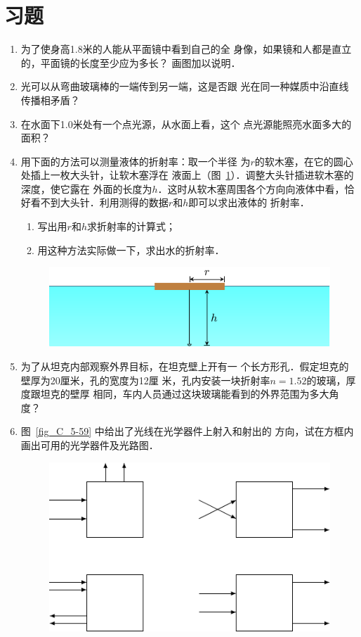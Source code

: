 \section*{习题}
\begin{enumerate}
    \item 为了使身高1.8米的人能从平面镜中看到自己的全
身像，如果镜和人都是直立的，平面镜的长度至少应为多长？
画图加以说明．
\item 光可以从弯曲玻璃棒的一端传到另一端，这是否跟
光在同一种媒质中沿直线传播相矛盾？
\item 在水面下1.0米处有一个点光源，从水面上看，这个
点光源能照亮水面多大的面积？
\item 用下面的方法可以测量液体的折射率：取一个半径
为$r$的软木塞，在它的圆心处插上一枚大头针，让软木塞浮在
液面上（图~\ref{fig_C_5-58}）．调整大头针插进软木塞的深度，使它露在
外面的长度为$h$．这时从软木塞周围各个方向向液体中看，恰
好看不到大头针．利用测得的数据$r$和$h$即可以求出液体的
折射率．
\begin{enumerate}
    \item 写出用$r$和$h$求折射率的计算式；
    \item 用这种方法实际做一下，求出水的折射率．
\end{enumerate}
\begin{figure}[htbp]
    \centering
    \includegraphics{fig/C/5-58.pdf}
    \caption{}\label{fig_C_5-58}
\end{figure}
\item 为了从坦克内部观察外界目标，在坦克壁上开有一
个长方形孔．假定坦克的壁厚为20厘米，孔的宽度为12厘
米，孔内安装一块折射率$n=1.52$的玻璃，厚度跟坦克的壁厚
相同，车内人员通过这块玻璃能看到的外界范围为多大角度？
\item 图~\ref{fig_C_5-59} 中给出了光线在光学器件上射入和射出的
方向，试在方框内画出可用的光学器件及光路图．
\begin{figure}[htbp]
    \centering
    \includegraphics{fig/C/5-59.pdf}

\end{figure}
\end{enumerate}
